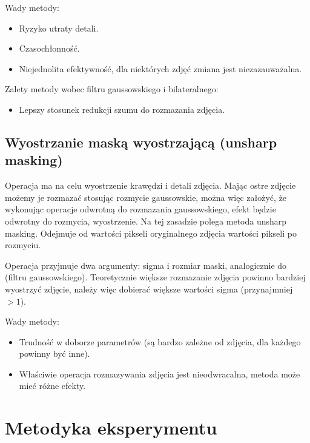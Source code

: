 \documentclass[]{mwart}
\begin{document}
Wady metody:
\begin{itemize}
    \item Ryzyko utraty detali.
    \item Czasochłonność.
    \item Niejednolita efektywność, dla niektórych zdjęć zmiana jest niezazauważalna.

\end{itemize}
Zalety metody wobec filtru gaussowskiego i bilateralnego:
\begin{itemize}
    \item Lepszy stosunek redukcji szumu do rozmazania zdjęcia.
\end{itemize}




\subsection{Wyostrzanie maską wyostrzającą (unsharp masking)}
Operacja ma na celu wyostrzenie krawędzi i detali zdjęcia. Mając ostre zdjęcie możemy je
rozmazać stosując rozmycie gaussowskie, można więc założyć, że wykonując operacje odwrotną do
rozmazania gaussowskiego, efekt będzie odwrotny do rozmycia, wyostrzenie. Na tej zasadzie
polega metoda unsharp masking. Odejmuje od wartości pikseli oryginalnego zdjęcia wartości
pikseli po rozmyciu.

Operacja przyjmuje dwa argumenty: sigma i rozmiar maski, analogicznie do (filtru gaussowskiego).
Teoretycznie większe rozmazanie zdjęcia powinno bardziej wyostrzyć zdjęcie, należy więc dobierać
większe wartości sigma (przynajmniej $>1$). \newline

Wady metody:
\begin{itemize}
    \item Trudność w doborze parametrów (są bardzo zależne od zdjęcia, dla każdego powinny być inne).
    \item Właściwie operacja rozmazywania zdjęcia jest nieodwracalna, metoda może mieć różne efekty.
\end{itemize}
















\newpage
\section{Metodyka eksperymentu}
\end{document}
